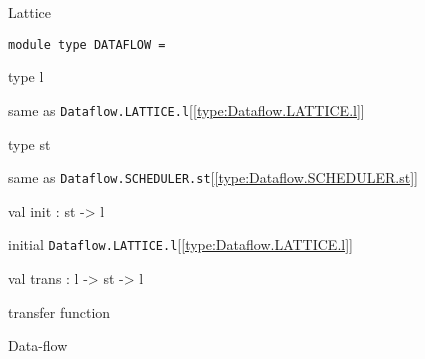 \documentclass[11pt]{article}
\begin{document}
\begin{ocamldocdescription}
Lattice


\end{ocamldocdescription}




\begin{ocamldoccode}
{\tt{module type }}{\tt{DATAFLOW}}{\tt{ = }}\end{ocamldoccode}
\label{moduletype:Dataflow.DATAFLOW}

\begin{ocamldocsigend}


\label{type:Dataflow.DATAFLOW.l}\begin{ocamldoccode}
type l 
\end{ocamldoccode}
\begin{ocamldocdescription}
same as {\tt{Dataflow.LATTICE.l}}[\ref{type:Dataflow.LATTICE.l}]


\end{ocamldocdescription}


\label{type:Dataflow.DATAFLOW.st}\begin{ocamldoccode}
type st 
\end{ocamldoccode}
\begin{ocamldocdescription}
same as {\tt{Dataflow.SCHEDULER.st}}[\ref{type:Dataflow.SCHEDULER.st}]


\end{ocamldocdescription}


\label{val:Dataflow.DATAFLOW.init}\begin{ocamldoccode}
val init : st -> l
\end{ocamldoccode}
\begin{ocamldocdescription}
initial {\tt{Dataflow.LATTICE.l}}[\ref{type:Dataflow.LATTICE.l}]


\end{ocamldocdescription}


\label{val:Dataflow.DATAFLOW.trans}\begin{ocamldoccode}
val trans : l -> st -> l
\end{ocamldoccode}
\begin{ocamldocdescription}
transfer function


\end{ocamldocdescription}
\end{ocamldocsigend}


\begin{ocamldocdescription}
Data-flow


\end{ocamldocdescription}
\end{document}
